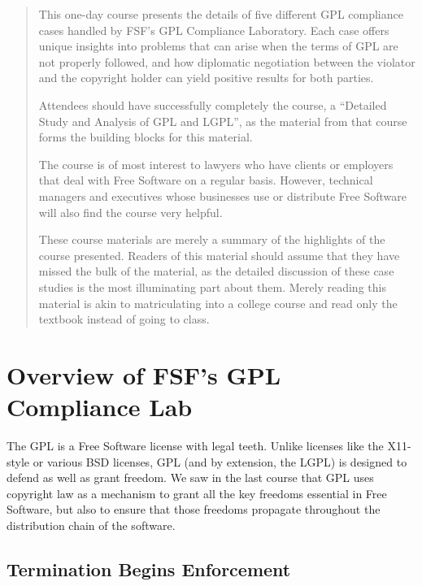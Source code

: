 \documentclass[12pt]{report}
\begin{document}
\begin{abstract}

This one-day course presents the details of five different GPL compliance
cases handled by FSF's GPL Compliance Laboratory.  Each case offers unique
insights into problems that can arise when the terms of GPL are not
properly followed, and how diplomatic negotiation between the violator and
the copyright holder can yield positive results for both parties.

Attendees should have successfully completely the course, a ``Detailed
Study and Analysis of GPL and LGPL'', as the material from that course
forms the building blocks for this material.

The course is of most interest to lawyers who have clients or employers
that deal with Free Software on a regular basis.  However, technical
managers and executives whose businesses use or distribute Free Software
will also find the course very helpful.

\bigskip

These course materials are merely a summary of the highlights of the
course presented.  Readers of this material should assume that they have
missed the bulk of the material, as the detailed discussion of these case
studies is the most illuminating part about them.  Merely reading this
material is akin to matriculating into a college course and read only the
textbook instead of going to class.

\end{abstract}

\tableofcontents

\pagebreak


\chapter{Overview of FSF's GPL Compliance Lab}

The GPL is a Free Software license with legal teeth.  Unlike licenses like
the X11-style or various BSD licenses, GPL (and by extension, the LGPL) is
designed to defend as well as grant freedom.  We saw in the last course
that GPL uses copyright law as a mechanism to grant all the key freedoms
essential in Free Software, but also to ensure that those freedoms
propagate throughout the distribution chain of the software.

\section{Termination Begins Enforcement}
\end{document}
